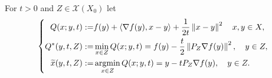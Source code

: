 \documentclass[12pt,english]{article}
\begin{document}
For $t>0$ and $Z\in \mathcal X(X_0)$  let
%
\begin{equation}\label{eq:DefQ}
%
\left\{
\begin{aligned}
Q(x ; y, t) :=& f(y) + \scp{\nabla f(y)}{x-y} + \frac{1}{2t}\norm{x-y}^2\quad x,y\in X,\\
Q^*(y,t,Z) :=& \min_{x\in Z} Q(x ; y, t) = f(y) - \frac{t}{2}\norm{P_Z\nabla f(y)}^2,\quad y\in Z,\\ 
\widetilde{x}(y,t,Z) :=& \argmin\limits_{x\in Z} Q(x ; y, t) = y - tP_Z\nabla f(y),\quad y\in Z.
\end{aligned}
\right.
\end{equation}
%


%



\printbibliography
%
\end{document}
